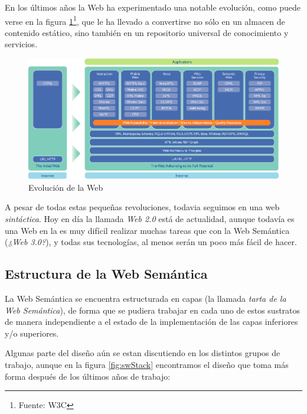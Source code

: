 En los últimos años la Web ha experimentado una notable evolución, como puede 
verse en la figura \ref{fig:evoWeb}\footnote{Fuente: W3C}, que le ha llevado a 
convertirse no sólo en un almacen de contenido estático, sino también en un 
repositorio universal de conocimiento y servicios.

\begin{figure}[H]
	\centering
	\includegraphics[width=12cm]{images/web-evolution.png}
	\caption{Evolución de la Web}
	\label{fig:evoWeb}
\end{figure}

A pesar de todas estas pequeñas revoluciones, todavia seguimos en una web 
\emph{sintáctica}. Hoy en día la llamada \emph{Web 2.0}\cite{O'Reilly2005} está
de actualidad, aunque todavía es una Web en la es muy difícil realizar muchas 
tareas que con la Web Semántica (\emph{¿Web 3.0?}), y todas sus tecnologías, 
al menos serán un poco más fácil de hacer.

\subsection{Estructura de la Web Semántica}

La Web Semántica se encuentra estructurada en capas (la llamada \emph{tarta de 
la Web Semántica}), de forma que se pudiera trabajar en cada uno de estos
sustratos de manera independiente a el estado de la implementación de las
capas inferiores y/o superiores.

Algunas parte del diseño aún se estan discutiendo en los distintos grupos de
trabajo, aunque en la figura \ref{fig:swStack} encontramos el diseño que toma
más forma después de los últimos años de trabajo:

